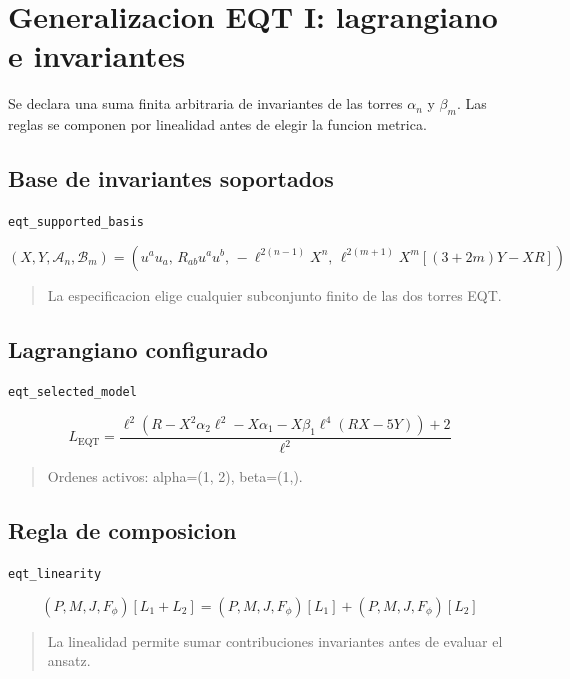 \documentclass[11pt,a4paper]{article}
\begin{document}
\section{Generalizacion EQT I: lagrangiano e invariantes}

Se declara una suma finita arbitraria de invariantes de las torres $\alpha_n$ y $\beta_m$. Las reglas se componen por linealidad antes de elegir la funcion metrica.

\subsection{Base de invariantes soportados}

\noindent\texttt{eqt\_supported\_basis}\par\nopagebreak[4]

\[
(X,Y,\mathcal A_n,\mathcal B_m) = \left(u^au_a,\,R_{ab}u^au^b,\,-\ell^{2(n-1)}X^n,\,\ell^{2(m+1)}X^m[(3+2m)Y-XR]\right)
\]

\begin{quote}\small La especificacion elige cualquier subconjunto finito de las dos torres EQT.\end{quote}

\subsection{Lagrangiano configurado}

\noindent\texttt{eqt\_selected\_model}\par\nopagebreak[4]

\[
L_{\mathrm{EQT}} = \frac{\ell^{2} \left(R - X^{2} \alpha_{2} \ell^{2} - X \alpha_{1} - X \beta_{1} \ell^{4} \left(R X - 5 Y\right)\right) + 2}{\ell^{2}}
\]

\begin{quote}\small Ordenes activos: alpha=(1, 2), beta=(1,).\end{quote}

\subsection{Regla de composicion}

\noindent\texttt{eqt\_linearity}\par\nopagebreak[4]

\[
(P,M,J,F_\phi)[L_1+L_2] = (P,M,J,F_\phi)[L_1]+(P,M,J,F_\phi)[L_2]
\]

\begin{quote}\small La linealidad permite sumar contribuciones invariantes antes de evaluar el ansatz.\end{quote}
\end{document}
